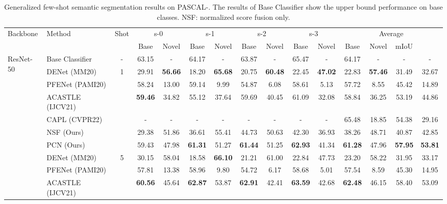 \documentclass[journal]{IEEEtran}
\begin{document}
\begin{table*}[ht]
    \centering
    \caption{Generalized few-shot semantic segmentation results on PASCAL-. The results of Base Classifier show the upper bound performance on base classes. NSF: normalized score fusion only.}
\begin{adjustbox}{max width=\textwidth}
    \begin{tabular}{l|l|c|cccccccc|cccc}
    \hline
         \multirow{2}{*}{Backbone} & \multirow{2}{*}{Method} & \multirow{2}{*}{Shot} & \multicolumn{2}{c}{s-0} &  \multicolumn{2}{c}{s-1} &  \multicolumn{2}{c}{s-2} &  \multicolumn{2}{c}{s-3} & \multicolumn{4}{c}{Average}  \\
         \cline{4-15}
         & & & Base & Novel & Base & Novel & Base & Novel & Base & Novel & Base & Novel & mIoU &  \\
         \hline
         \multirow{11}{*}{ResNet-50} & Base Classifier & - & 63.15 & - & 64.17 & - & 63.87 & - & 65.47 & - & 64.17 & - & - & - \\
         \cline{3-15}
         & DENet (MM20) & \multirow{6}{*}{1} & 29.91 & \textbf{56.66} & 18.20 & \textbf{65.68} & 20.75 & \textbf{60.48} & 22.45 & \textbf{47.02} & 22.83 & \textbf{57.46} & 31.49 & 32.67 \\
         & PFENet (PAMI20) & & 58.24 & 13.00 & 59.14 & 9.99 & 54.87 & 6.08 & 58.61 & 5.13 & 57.72 & 8.55 & 45.42 & 14.89 \\
         & ACASTLE (IJCV21) & & \textbf{59.46} & 34.82 & 55.12 & 37.64 & 59.69 & 40.45 & 61.09 & 32.08 & 58.84 & 36.25 & 53.19 & 44.86 \\
         & CAPL (CVPR22) & & - & - & - & - & - & - & - & - & 65.48 & 18.85 & 54.38 & 29.16 \\
         & NSF (Ours) & & 29.38 & 51.86 & 36.61 & 55.41 & 44.73 & 50.63 & 42.30 & 36.93 & 38.26 & 48.71 & 40.87 & 42.85 \\
         & PCN (Ours) & & 59.43 & 47.98 & \textbf{61.31} & 51.27 & \textbf{61.44} & 51.25 & \textbf{62.93} & 41.34 & \textbf{61.28} & 47.96 & \textbf{57.95} & \textbf{53.81} \\
         \cline{2-15}
         & DENet (MM20) & \multirow{6}{*}{5} & 30.15 & 58.04 & 18.58 & \textbf{66.10} & 21.21 & 61.00 & 22.84 & 47.73 & 23.20 & 58.22 & 31.95 & 33.17 \\
         & PFENet (PAMI20) & & 57.81 & 13.38 & 58.96 & 9.80 & 54.72 & 6.17 & 58.68 & 5.01 & 57.54 & 8.59 & 45.30 & 14.95 \\
         & ACASTLE (IJCV21) & & \textbf{60.56} & 45.64 & \textbf{62.87} & 53.87 & \textbf{62.91} & 42.41 & \textbf{63.59} & 42.68 & \textbf{62.48} & 46.15 & 58.40 & 53.09 \\

\end{tabular}
\end{adjustbox}
\end{table*}
\end{document}

